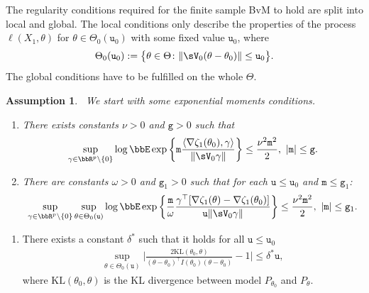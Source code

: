 \documentclass[11pt]{article}
\newtheorem{assumption}{Assumption}[section]
\begin{document}
 The regularity conditions required for the finite sample BvM to hold are split into local and global. The local conditions only describe the properties of the process \(\ell(X_1,\theta)\)
  for \(\theta \in \Theta_0(\mathtt{u}_0) \) with some fixed value \(\mathtt{u}_0\), where
  \begin{align}
    \Theta_0(\mathtt{u}_0)
    :=
    \big\{\theta \in \Theta \colon \|\sV_0(\theta - \theta_0)\| \le  \mathtt{u}_0 \big\}.
  \end{align}
The global conditions have to be fulfilled on the whole \(\Theta\).
\begin{assumption}~\label{ass:Spokoiny}
We start with some exponential moments conditions. 
  \begin{enumerate}
    \item[\({(e\!d_{0})} \)]
      There exists constants \(\nu>0\)
       and \( \mathtt{g} > 0 \) such that
      \begin{align}
        \sup_{\gamma \in \bbR^{p}\setminus \{0\}} \log\bbE \exp\left\{
              \mathtt{m} \frac{\langle \nabla \zeta_1(\theta_0),\gamma \rangle}
              {\| \sV_0 \gamma \|}
              \right\}
        \le
        \frac{\nu^{2} \mathtt{m}^{2}}{2}, ~ |\mathtt{m}| \le \mathtt{g}.
      \end{align}

    \item[\( {(e\!d_{1})} \)]
      There are constants \( \omega > 0 \) and $\mathtt{g}_1>0$ such that for each $\mathtt{u} \leq \mathtt{u}_0$ and $\mathtt{m} \le \mathtt{g}_1$:
      \begin{align}
        \sup_{\gamma \in \bbR^{p}\setminus \{0\}} \sup_{\theta \in \Theta_0(\mathtt{u})} \log \bbE \exp\left\{
        \frac{\mathtt{m}}{\omega} \frac{\gamma^{\top}[\nabla \zeta_1(\theta) - \nabla \zeta_1(\theta_0)  ] }{ \mathtt{u} \|\sV_0 \gamma\|}
        \right\}
        \le
        \frac{\nu^{2} \mathtt{m}^{2}}{2}, ~ |\mathtt{m}| \le \mathtt{g}_1.
      \end{align}
  \end{enumerate}
\end{assumption}

  \begin{enumerate}
    \item[\({(\ell_0)} \)]
      There exists a constant \(\delta^*\) such that it holds for all \(\mathtt{u} \le \mathtt{u}_0\)
      \begin{align}
       \sup_{\theta \in \Theta_0(\mathtt{u})} \bigg|\frac{2\text{KL}(\theta_0,\theta)}{(\theta -\theta_0)^{\top}I(\theta_0)(\theta -\theta_0)}-1 \bigg|
        \le
        \delta^* \mathtt{u},
      \end{align}
      where $\text{KL}(\theta_0,\theta)$ is the KL divergence between model $P_{\theta_0}$ and $P_{\theta}$.
  \end{enumerate}
 
\end{document}
